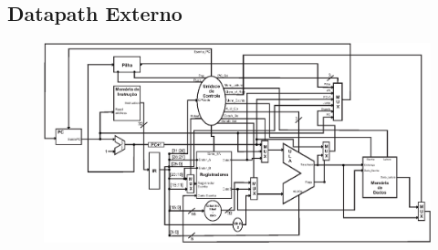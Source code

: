 \documentclass{report}
\begin{document}
	
	\newpage
	
	
	\newpage
	
		
	\newpage
	
	
	\newpage
	
	\begin{landscape}
	\section{Datapath Externo}
	\begin{figure}[htpb!]
    	\includegraphics{./datapath/datapath_final-1.eps}
  	\end{figure}
  	\end{landscape}

% 
% 
\end{document}
